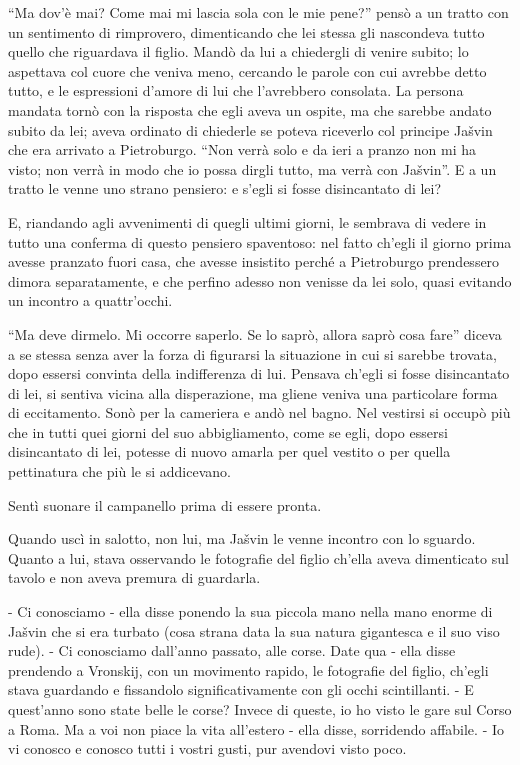 ``Ma dov'è mai? Come mai mi lascia sola con le mie pene?'' pensò a un tratto con un sentimento di rimprovero, dimenticando che lei stessa gli nascondeva tutto quello che riguardava il figlio. Mandò da lui a chiedergli di venire subito; lo aspettava col cuore che veniva meno, cercando le parole con cui avrebbe detto tutto, e le espressioni d'amore di lui che l'avrebbero consolata. La persona mandata tornò con la risposta che egli aveva un ospite, ma che sarebbe andato subito da lei; aveva ordinato di chiederle se poteva riceverlo col principe Jašvin che era arrivato a Pietroburgo. ``Non verrà solo e da ieri a pranzo non mi ha visto; non verrà in modo che io possa dirgli tutto, ma verrà con Jašvin''. E a un tratto le venne uno strano pensiero: e s'egli si fosse disincantato di lei? 

E, riandando agli avvenimenti di quegli ultimi giorni, le sembrava di vedere in tutto una conferma di questo pensiero spaventoso: nel fatto ch'egli il giorno prima avesse pranzato fuori casa, che avesse insistito perché a Pietroburgo prendessero dimora separatamente, e che perfino adesso non venisse da lei solo, quasi evitando un incontro a quattr'occhi. 

``Ma deve dirmelo. Mi occorre saperlo. Se lo saprò, allora saprò cosa fare'' diceva a se stessa senza aver la forza di figurarsi la situazione in cui si sarebbe trovata, dopo essersi convinta della indifferenza di lui. Pensava ch'egli si fosse disincantato di lei, si sentiva vicina alla disperazione, ma gliene veniva una particolare forma di eccitamento. Sonò per la cameriera e andò nel bagno. Nel vestirsi si occupò più che in tutti quei giorni del suo abbigliamento, come se egli, dopo essersi disincantato di lei, potesse di nuovo amarla per quel vestito o per quella pettinatura che più le si addicevano. 

Sentì suonare il campanello prima di essere pronta. 

Quando uscì in salotto, non lui, ma Jašvin le venne incontro con lo sguardo. Quanto a lui, stava osservando le fotografie del figlio ch'ella aveva dimenticato sul tavolo e non aveva premura di guardarla. 

- Ci conosciamo - ella disse ponendo la sua piccola mano nella mano enorme di Jašvin che si era turbato (cosa strana data la sua natura gigantesca e il suo viso rude). - Ci conosciamo dall'anno passato, alle corse. Date qua - ella disse prendendo a Vronskij, con un movimento rapido, le fotografie del figlio, ch'egli stava guardando e fissandolo significativamente con gli occhi scintillanti. - E quest'anno sono state belle le corse? Invece di queste, io ho visto le gare sul Corso a Roma. Ma a voi non piace la vita all'estero - ella disse, sorridendo affabile. - Io vi conosco e conosco tutti i vostri gusti, pur avendovi visto poco. 

